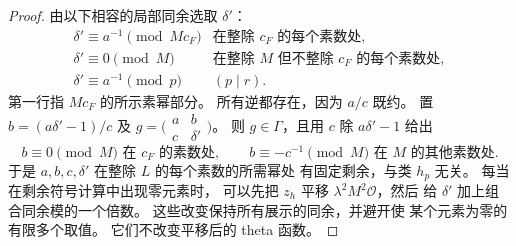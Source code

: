 \documentclass[11pt,a4paper]{article}
\numberwithin{equation}{section}
\numberwithin{figure}{section}
\theoremstyle{definition}
\theoremstyle{remark}
\begin{document}
\begin{proof}
由以下相容的局部同余选取 $\delta'$：
\[
 \begin{array}{ll}
 \delta'\equiv a^{-1}\pmod{Mc_F}
       &\text{在整除 }c_F\text{ 的每个素数处},\\
 \delta'\equiv0\pmod M
       &\text{在整除 }M\text{ 但不整除 }c_F\text{ 的每个素数处},\\
 \delta'\equiv a^{-1}\pmod p& (p\mid r).
 \end{array}
\]
第一行指 $Mc_F$ 的所示素幂部分。
所有逆都存在，因为 $a/c$ 既约。 置
$b=(a\delta'-1)/c$ 及 $g=\bigl(\begin{smallmatrix}a&b\\c&\delta'\end{smallmatrix}\bigr)$。
则 $g\in\Gamma$，且用 $c$ 除 $a\delta'-1$ 给出
\[
 b\equiv0\pmod M\text{ 在 }c_F\text{ 的素数处},\qquad
 b\equiv-c^{-1}\pmod M\text{ 在 }M\text{ 的其他素数处}.
\]
于是 $a,b,c,\delta'$ 在整除 $L$ 的每个素数的所需幂处
有固定剩余，与类 $h_p$ 无关。
每当在剩余符号计算中出现零元素时，
可以先把 $z_h$ 平移 $\lambda^2M^2\mathcal O$，然后
给 $\delta'$ 加上组合同余模的一个倍数。
这些改变保持所有展示的同余，并避开使
某个元素为零的有限多个取值。 它们不改变平移后的
theta 函数。


\end{proof}
\end{document}
